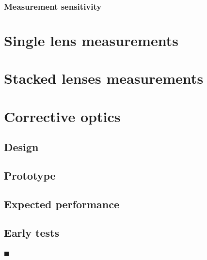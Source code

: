 \begin{refsection}
\subsubsection*{Measurement sensitivity}

\section{Single lens measurements}

\section{Stacked lenses measurements}

\section{Corrective optics}
\subsection{Design}\label{sec:design}

\subsection{Prototype}\label{sec:prototype}

\subsection{Expected performance}\label{sec:performance}

\subsection{Early tests}\label{sec:prototype_testing}


$\blacksquare$
\printbibliography[heading=subbibliography]
\end{refsection}

